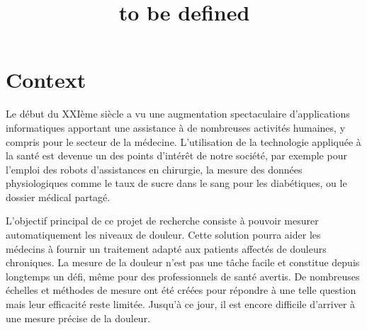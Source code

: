 \documentclass[11pt]{article}
\date{}
\title{to be defined}
\begin{document}
\maketitle

\usepackage{xcolor}
\newcommand{\vincent}[1]{{\color{ForestGreen}#1}}
\newcommand{\vincentrmk}[1]{{\color{ForestGreen}\bf #1}}


\section{Context}
\label{sec:orgf816e45}

Le début  du XXIème  siècle a vu  une augmentation  spectaculaire d’applications
informatiques apportant  une assistance  à de  nombreuses activités  humaines, y
compris  pour  le  secteur  de  la médecine.  L’utilisation  de  la  technologie
appliquée à la santé  est devenue un des points d’intérêt  de notre société, par
exemple  pour l’emploi  des robots  d'assistances  en chirurgie,  la mesure  des
données physiologiques comme le taux de sucre dans le sang pour les diabétiques,
ou le dossier médical partagé.



L’objectif  principal de  ce  projet  de recherche  consiste  à pouvoir  mesurer
automatiquement  les  niveaux  de  douleur.  Cette
solution   pourra  aider  les médecins  à fournir  un  traitement adapté  aux
patients affectés de douleurs chroniques. La  mesure de la douleur n’est pas une
tâche facile et constitue depuis longtemps un défi, même pour des professionnels
de santé  avertis. De nombreuses échelles  et méthodes de mesure  ont été créées
pour             répondre à            une             telle             question
\cite{wong1996wong,mccaffery1999pain,portenoy1996visual,melzack1975mcgill,galer1997development,gracely1988descriptor}
mais leur  efficacité reste limitée.  Jusqu’à  ce jour, il est  encore difficile
d’arriver à une mesure précise de la douleur.
\end{document}
